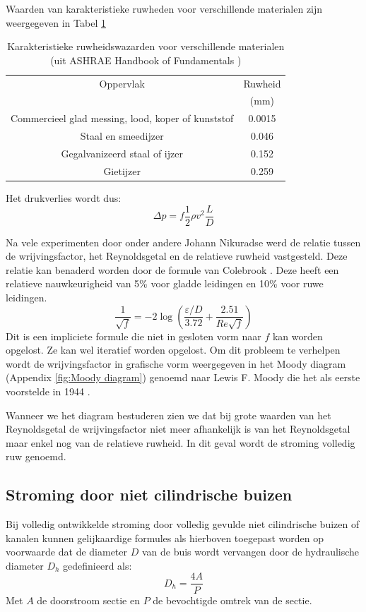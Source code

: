 Waarden van karakteristieke ruwheden voor verschillende materialen zijn weergegeven in Tabel \ref{tab:ruwheid van materialen}
\begin{table}[htb]
	\centering
	\begin{tabular}{cc}
		\hline
		Oppervlak & Ruwheid \\
		   & (mm) \\
		\hline
		Commercieel glad messing, lood, koper of kunststof & 0.0015 \\
		Staal en smeedijzer & 0.046 \\
		Gegalvanizeerd staal of ijzer & 0.152 \\
		Gietijzer & 0.259 \\
		\hline
	\end{tabular}
	\caption{Karakteristieke ruwheidswazarden voor verschillende materialen (uit ASHRAE Handbook of Fundamentals \cite{ASHRAE_Fundamentals})}
	\label{tab:ruwheid van materialen}
\end{table}
Het drukverlies wordt dus:
\begin{equation}
	\Delta p = f \frac{1}{2}\rho v^2 \frac{L}{D}
	\label{eqn:drukval bij turbulente stroming}
\end{equation}

Na vele experimenten door onder andere Johann Nikuradse \cite{Nikuradse1926} werd de relatie tussen de wrijvingsfactor, het Reynoldsgetal en de relatieve ruwheid vastgesteld. Deze relatie kan benaderd worden door de formule van Colebrook \cite{Colebrook1937}. Deze heeft een relatieve nauwkeurigheid van 5\% voor gladde leidingen en 10\% voor ruwe leidingen.
\begin{equation}
	\frac{1}{\sqrt{f}} = -2 \log \left( \frac{\varepsilon/D}{3.72} + \frac{2.51}{Re \sqrt{f}} \right)
\end{equation}
Dit is een impliciete formule die niet in gesloten vorm naar $f$ kan worden opgelost. Ze kan wel iteratief worden opgelost.  Om dit probleem te verhelpen wordt de wrijvingsfactor in grafische vorm weergegeven in het Moody diagram (Appendix \ref{fig:Moody diagram}) genoemd naar Lewis F. Moody die het als eerste voorstelde in 1944 \cite{Moody1944}.

Wanneer we het diagram bestuderen zien we dat bij grote waarden van het Reynoldsgetal de wrijvingsfactor niet meer afhankelijk is van het Reynoldsgetal maar enkel nog van de relatieve ruwheid. In dit geval wordt de stroming volledig ruw genoemd.

		\subsection{Stroming door niet cilindrische buizen}
Bij volledig ontwikkelde stroming door volledig gevulde niet cilindrische buizen of kanalen kunnen gelijkaardige formules als hierboven toegepast worden op voorwaarde dat de diameter $D$ van de buis wordt vervangen door de hydraulische diameter $D_h$ gedefinieerd als:
\begin{equation}
	D_h = \frac{4 A}{P}
\end{equation}
Met $A$ de doorstroom sectie en $P$ de bevochtigde omtrek van de sectie.
	


